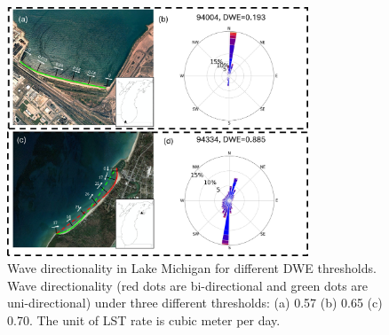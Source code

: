 \begin{figure}[htbp]
  \centering
  \includegraphics[width=0.8\textwidth]{appendix/resources/figure3-3a.jpg}
  \caption{Wave directionality in Lake Michigan for different DWE thresholds. Wave directionality (red dots are bi-directional and green dots are uni-directional) under three different thresholds: (a) 0.57 (b) 0.65 (c) 0.70. The unit of LST rate is cubic meter per day.}
  \label{fig:fig3.3a}
\end{figure}



